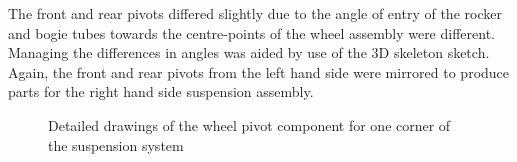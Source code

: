         The front and rear pivots differed slightly due to the angle of entry of the rocker and bogie tubes towards the centre-points of the wheel assembly were different. Managing the differences in angles was aided by use of the 3D skeleton sketch. Again, the front and rear pivots from the left hand side were mirrored to produce parts for the right hand side suspension assembly.
       
        \begin{figure}[H]
        \centering
        \caption[Detailed drawings of the wheel pivot component for one corner of the suspension system]{Detailed drawings of the wheel pivot component for one corner of the suspension system}
        \label{fig:mechDesign-wheelPivotDetail}
        \end{figure}
          
